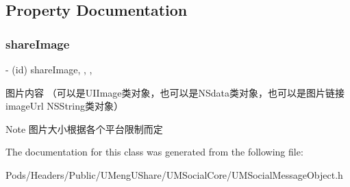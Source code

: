 \subsection{Property Documentation}
\mbox{\label{interface_u_m_share_image_object_af4e4f090ffb221e028897213715c22ff}} 
\subsubsection{\texorpdfstring{share\+Image}{shareImage}}
{\footnotesize\ttfamily -\/ (id) share\+Image\hspace{0.3cm}{\ttfamily [read]}, {\ttfamily [write]}, {\ttfamily [nonatomic]}, {\ttfamily [retain]}}

图片内容 （可以是\+U\+I\+Image类对象，也可以是\+N\+Sdata类对象，也可以是图片链接image\+Url N\+S\+String类对象） \begin{DoxyNote}{Note}
图片大小根据各个平台限制而定 
\end{DoxyNote}


The documentation for this class was generated from the following file\+:\begin{DoxyCompactItemize}
\item 
Pods/\+Headers/\+Public/\+U\+Meng\+U\+Share/\+U\+M\+Social\+Core/U\+M\+Social\+Message\+Object.\+h\end{DoxyCompactItemize}
